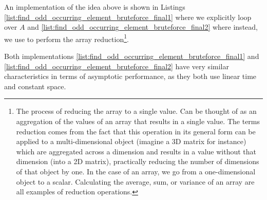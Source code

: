 An implementation of the idea above is shown in Listings \ref{list:find_odd_occurring_element_bruteforce_final1} where we explicitly loop over $A$ and \ref{list:find_odd_occurring_element_bruteforce_final2} where instead, we use  to perform the array reduction\footnote{
	The process of reducing the array to a single value. Can be thought of as an aggregation of the values of an array that results in a single value. The terms reduction comes from the fact that this operation in its general form can be applied to a multi-dimensional object (imagine a 3D matrix for instance)  which are aggregated across a dimension and results in a value without that dimension (into a 2D matrix), practically reducing the number of dimensions of that object by one. In the case of an array, we go from a one-dimensional object to a scalar. Calculating the average, sum, or variance of an array are all examples of reduction operations.}.






Both implementations \ref{list:find_odd_occurring_element_bruteforce_final1} and \ref{list:find_odd_occurring_element_bruteforce_final2} have very similar characteristics in terms of asymptotic performance, as they both use linear time and constant space. 